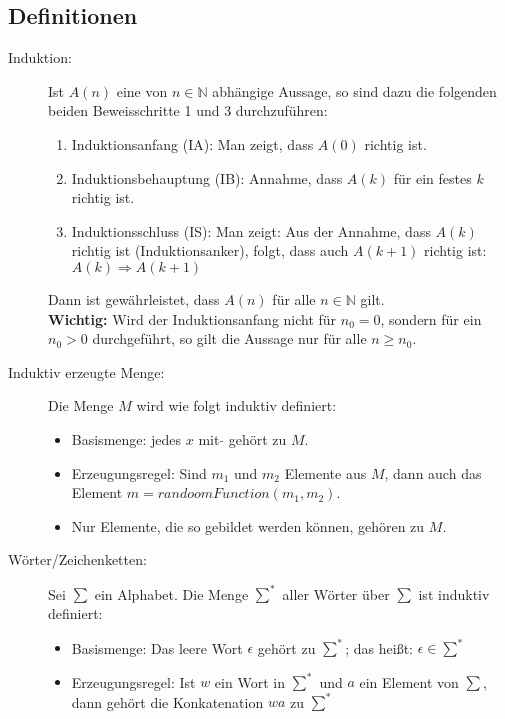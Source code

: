 \subsection*{Definitionen}
\begin{description}
  \item [Induktion:]
    Ist $A(n)$ eine von $n \in \mathbb{N}$ abhängige Aussage, so sind dazu die
    folgenden beiden Beweisschritte 1 und 3 durchzuführen:
    \begin{enumerate}
      \setlength{\itemsep}{-0.1cm}
      \item Induktionsanfang (IA): Man zeigt, dass $A(0)$ richtig ist.
      \item Induktionsbehauptung (IB): Annahme, dass $A(k)$ für ein festes $k$ 
            richtig ist.
      \item Induktionsschluss (IS): Man zeigt: Aus der Annahme, dass $A(k)$ 
            richtig ist (Induktionsanker), folgt, dass auch $A(k + 1)$ richtig 
            ist:\\
            $A(k) \Rightarrow A(k + 1)$
    \end{enumerate}
    Dann ist gewährleistet, dass $A(n)$ für alle $n \in \mathbb{N}$ gilt.\\
    \textbf{Wichtig:} Wird der Induktionsanfang nicht für $n_0 = 0$, sondern für
    ein $n_0 > 0$ durchgeführt, so gilt die Aussage nur für alle $n \geq n_0$.

  \item [Induktiv erzeugte Menge:]
    Die Menge $M$ wird wie folgt induktiv definiert:
    \begin{itemize}
      \setlength{\itemsep}{-0.1cm}
      \item Basismenge: jedes $x$ mit $\tilde{}$ gehört zu $M$.
      \item Erzeugungsregel: Sind $m_1$ und $m_2$ Elemente aus $M$, dann auch 
            das Element $m = randoomFunction(m_1,m_2)$.
      \item Nur Elemente, die so gebildet werden können, gehören zu $M$.
    \end{itemize}

  \item [Wörter/Zeichenketten:]
    Sei $\sum$ ein Alphabet. Die Menge $\sum^*$ aller Wörter über $\sum$ ist
    induktiv definiert:
    \begin{itemize}
      \setlength{\itemsep}{-0.1cm}
      \item Basismenge: Das leere Wort $\epsilon$ gehört zu $\sum^*$; das heißt:
            $\epsilon \in \sum^*$
      \item Erzeugungsregel: Ist $w$ ein Wort in $\sum^*$ und $a$ ein Element 
            von $\sum$, dann gehört die Konkatenation $wa$ zu $\sum^*$
    \end{itemize}


\end{description}
